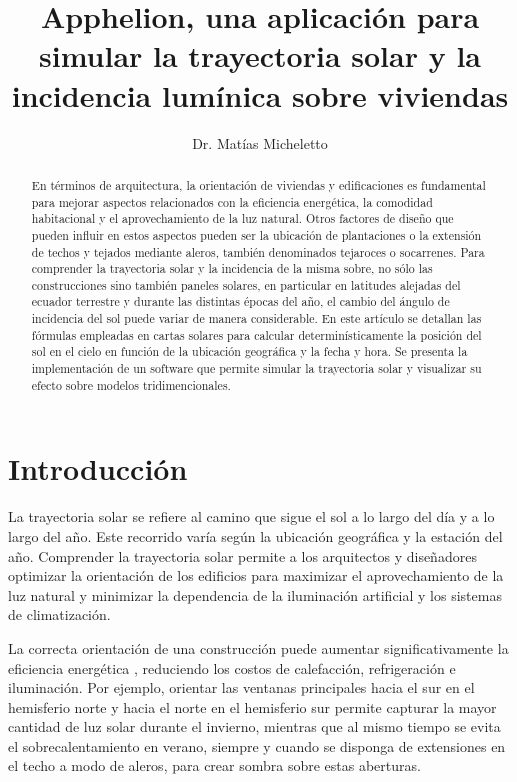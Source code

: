 \documentclass[a4paper]{article}
\title{Apphelion, una aplicación para simular la trayectoria solar y la incidencia lumínica sobre viviendas}
\date{}
\author{Dr. Matías Micheletto}
\affil{Sendevo Software, Bahía Blanca (8000), Buenos Aires, Argentina.}
\affil{\texttt{holasendevo@gmail.com}}
\begin{document}
\maketitle 

\begin{abstract} 
\noindent En términos de arquitectura, la orientación de viviendas y edificaciones es fundamental para mejorar aspectos relacionados con la eficiencia energética, la comodidad habitacional y el aprovechamiento de la luz natural. Otros factores de diseño que pueden influir en estos aspectos pueden ser la ubicación de plantaciones o la extensión de techos y tejados mediante aleros, también denominados tejaroces o socarrenes. Para comprender la trayectoria solar y la incidencia de la misma sobre, no sólo las construcciones sino también paneles solares, en particular en latitudes alejadas del ecuador terrestre y durante las distintas épocas del año, el cambio del ángulo de incidencia del sol puede variar de manera considerable. En este artículo se detallan las fórmulas empleadas en cartas solares para calcular determinísticamente la posición del sol en el cielo en función de la ubicación geográfica y la fecha y hora. Se presenta la implementación de un software que permite simular la trayectoria solar y visualizar su efecto sobre modelos tridimencionales.
\end{abstract}


\section{Introducción}

La trayectoria solar se refiere al camino que sigue el sol a lo largo del día y a lo largo del año. Este recorrido varía según la ubicación geográfica y la estación del año. Comprender la trayectoria solar permite a los arquitectos y diseñadores optimizar la orientación de los edificios para maximizar el aprovechamiento de la luz natural y minimizar la dependencia de la iluminación artificial y los sistemas de climatización.

La correcta orientación de una construcción puede aumentar significativamente la eficiencia energética \cite{salazar2014, wang2023}, reduciendo los costos de calefacción, refrigeración e iluminación. Por ejemplo, orientar las ventanas principales hacia el sur en el hemisferio norte y hacia el norte en el hemisferio sur permite capturar la mayor cantidad de luz solar durante el invierno, mientras que al mismo tiempo se evita el sobrecalentamiento en verano, siempre y cuando se disponga de extensiones en el techo a modo de aleros, para crear sombra sobre estas aberturas.
\end{document}
